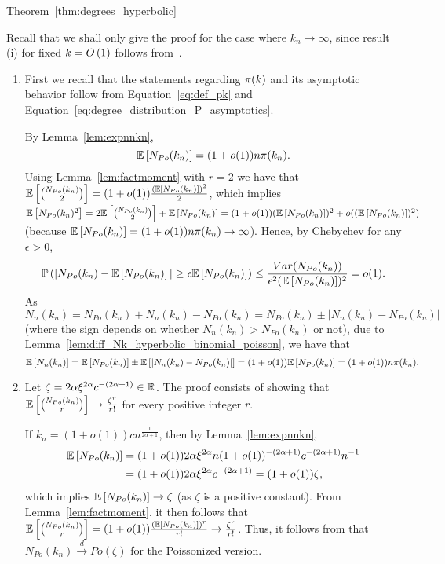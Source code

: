 \begin{proofof}{Theorem~\ref{thm:degrees_hyperbolic}}

Recall that we shall only give the proof for the case where $k_n \to \infty$, since result (i) for fixed $k = O\left(1\right)$ follows from~\cite{gugelmann2012random}.

\begin{enumerate}[\upshape (i)]
\item  First we recall that the statements regarding ${\pi}(k)$ and its asymptotic behavior follow from Equation~\ref{eq:def_pk} and Equation~\ref{eq:degree_distribution_P_asymptotics}.

By Lemma~\ref{lem:expnnkn},
\[
\mathbb{E}\left[{ N_{Po}(k_n) }\right]=(1+o(1))n {\pi}(k_n).
\]
Using Lemma~\ref{lem:factmoment} with $r=2$ we have that $\mathbb{E}\left[{N_{Po}(k_n) \choose 2}\right] = (1+o(1))\frac{(\mathbb{E}\left[ N_{Po}(k_n)\right])^2}{2}$, which implies $\mathbb{E}\left[N_{Po}(k_n)^2\right] = 2\mathbb{E}\left[{N_{Po}(k_n) \choose 2}\right] +\mathbb{E}\left[N_{Po}(k_n)\right] = (1+o(1))(\mathbb{E}\left[ N_{Po}(k_n)\right])^2 +o((\mathbb{E}\left[N_{Po}(k_n)\right])^2)$ (because $\mathbb{E}\left[N_{Po}(k_n)\right] = (1+o(1)) n{\pi}(k_n) \rightarrow \infty$). Hence, by Chebychev for any $\epsilon >0$,
\[
	\mathbb{P}\left(|N_{Po}(k_n)-\mathbb{E}\left[N_{Po}(k_n)\right]|\geq \epsilon \mathbb{E}\left[N_{Po}(k_n)\right]\right)
	\leq \frac{Var(N_{Po}(k_n))}{\epsilon^2 (\mathbb{E}\left[ N_{Po}(k_n)\right])^2} = o(1).
\]
As $N_n(k_n)=N_{Po}(k_n)+N_n(k_n)-N_{Po}(k_n) = N_{Po}(k_n)\pm |N_n(k_n)-N_{Po}(k_n)|$ (where the sign depends on whether $N_n(k_n)>N_{Po}(k_n)$ or not), due to Lemma~\ref{lem:diff_Nk_hyperbolic_binomial_poisson}, we have that
\[
	\mathbb{E}\left[N_n(k_n)\right] = \mathbb{E}\left[N_{Po}(k_n)\right] \pm \mathbb{E}\left[ |N_n(k_n)-N_{Po}(k_n)|\right] = (1+o(1))\mathbb{E}\left[N_{Po}(k_n)\right] = (1+o(1))n {\pi}(k_n).
\]

\item Let $\zeta = 2\alpha \xi^{2\alpha}c^{-(2\alpha+1)} \in {\ensuremath{\mathbb R}}$.
The proof consists of showing that $\mathbb{E}\left[{N_{Po}(k_n) \choose r} \right] \rightarrow \frac{\zeta^r}{r!}$ for every positive integer $r$.%

If $k_n=(1+o(1))c n^{\frac{1}{2\alpha+1}}$, then by Lemma~\ref{lem:expnnkn},
\begin{align*}
	\mathbb{E}\left[N_{Po}(k_n)\right] &= (1+o(1))2\alpha \xi^{2\alpha} n (1+o(1))^{-(2\alpha+1)} c^{-(2\alpha+1)}n^{-1} \\
	&= (1+o(1))2\alpha \xi^{2\alpha} c^{-(2\alpha+1)}=(1+o(1))\zeta,
\end{align*}
which implies $\mathbb{E}\left[N_{Po}(k_n)\right] \rightarrow \zeta$ (as $\zeta$ is a positive constant). From Lemma~\ref{lem:factmoment}, it then follows that $\mathbb{E}\left[{N_{Po}(k_n) \choose r}\right] =(1+o(1))\frac{(\mathbb{E}\left[ N_{Po}(k_n)\right])^r}{r!}\rightarrow \frac{\zeta^r}{r!}$. Thus, it follows from \cite[Theorem 8.3.1]{alon2016probabilistic} that $N_{Po}(k_n) \xrightarrow{d} Po(\zeta)$ for the Poissonized version.


\end{enumerate}
\end{proofof}
